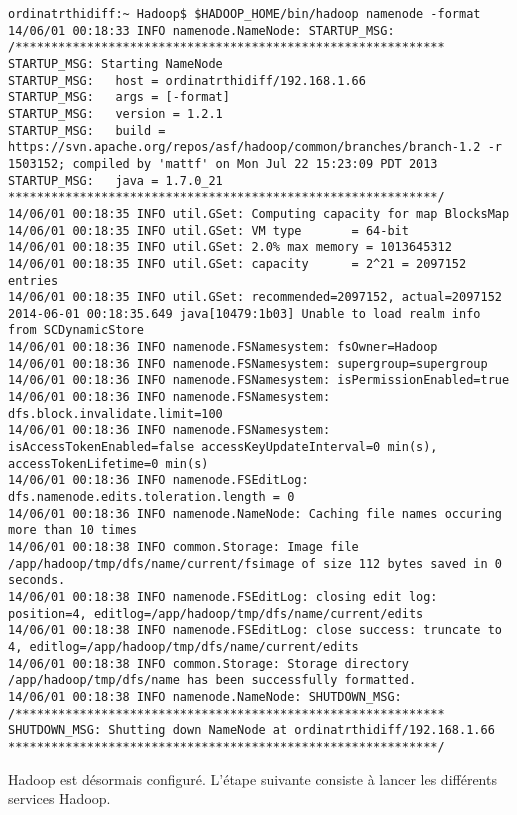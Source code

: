 \begin{verbatim}
ordinatrthidiff:~ Hadoop$ $HADOOP_HOME/bin/hadoop namenode -format
14/06/01 00:18:33 INFO namenode.NameNode: STARTUP_MSG: 
/************************************************************
STARTUP_MSG: Starting NameNode
STARTUP_MSG:   host = ordinatrthidiff/192.168.1.66
STARTUP_MSG:   args = [-format]
STARTUP_MSG:   version = 1.2.1
STARTUP_MSG:   build = https://svn.apache.org/repos/asf/hadoop/common/branches/branch-1.2 -r 1503152; compiled by 'mattf' on Mon Jul 22 15:23:09 PDT 2013
STARTUP_MSG:   java = 1.7.0_21
************************************************************/
14/06/01 00:18:35 INFO util.GSet: Computing capacity for map BlocksMap
14/06/01 00:18:35 INFO util.GSet: VM type       = 64-bit
14/06/01 00:18:35 INFO util.GSet: 2.0% max memory = 1013645312
14/06/01 00:18:35 INFO util.GSet: capacity      = 2^21 = 2097152 entries
14/06/01 00:18:35 INFO util.GSet: recommended=2097152, actual=2097152
2014-06-01 00:18:35.649 java[10479:1b03] Unable to load realm info from SCDynamicStore
14/06/01 00:18:36 INFO namenode.FSNamesystem: fsOwner=Hadoop
14/06/01 00:18:36 INFO namenode.FSNamesystem: supergroup=supergroup
14/06/01 00:18:36 INFO namenode.FSNamesystem: isPermissionEnabled=true
14/06/01 00:18:36 INFO namenode.FSNamesystem: dfs.block.invalidate.limit=100
14/06/01 00:18:36 INFO namenode.FSNamesystem: isAccessTokenEnabled=false accessKeyUpdateInterval=0 min(s), accessTokenLifetime=0 min(s)
14/06/01 00:18:36 INFO namenode.FSEditLog: dfs.namenode.edits.toleration.length = 0
14/06/01 00:18:36 INFO namenode.NameNode: Caching file names occuring more than 10 times 
14/06/01 00:18:38 INFO common.Storage: Image file /app/hadoop/tmp/dfs/name/current/fsimage of size 112 bytes saved in 0 seconds.
14/06/01 00:18:38 INFO namenode.FSEditLog: closing edit log: position=4, editlog=/app/hadoop/tmp/dfs/name/current/edits
14/06/01 00:18:38 INFO namenode.FSEditLog: close success: truncate to 4, editlog=/app/hadoop/tmp/dfs/name/current/edits
14/06/01 00:18:38 INFO common.Storage: Storage directory /app/hadoop/tmp/dfs/name has been successfully formatted.
14/06/01 00:18:38 INFO namenode.NameNode: SHUTDOWN_MSG: 
/************************************************************
SHUTDOWN_MSG: Shutting down NameNode at ordinatrthidiff/192.168.1.66
************************************************************/
\end{verbatim}

\par Hadoop est désormais configuré. L'étape suivante consiste à lancer les différents services Hadoop.

